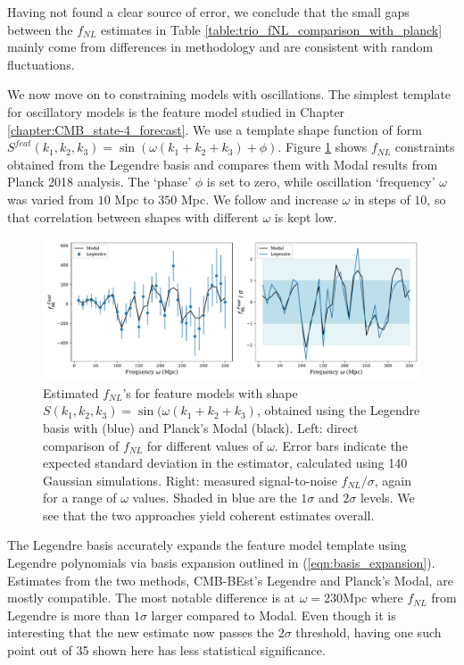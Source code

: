 Having not found a clear source of error, we conclude that the small gaps between the $f_{NL}$ estimates in Table \ref{table:trio_fNL_comparison_with_planck} mainly come from differences in methodology and are consistent with random fluctuations.

We now move on to constraining models with oscillations. The simplest template for oscillatory models is the feature model studied in Chapter \ref{chapter:CMB_state-4_forecast}. We use a template shape function of form $S^{feat}(k_1,k_2,k_3) = \sin(\omega (k_1 + k_2 + k_3) + \phi)$. Figure \ref{fig:sine_template_frequency_Legendre_Modal} shows $f_{NL}$ constraints obtained from the Legendre basis and compares them with Modal results from Planck 2018 analysis. The `phase' $\phi$ is set to zero, while oscillation `frequency' $\omega$ was varied from $10$ Mpc to $350$ Mpc. We follow \cite{Fergusson2015a} and increase $\omega$ in steps of $10$, so that correlation between shapes with different $\omega$ is kept low.

\begin{figure}[htbp!] 
	\centering    
	\includegraphics[width=\textwidth]{sine_template_frequency_Legendre_Modal.pdf}
	\caption{Estimated $f_{NL}$'s for feature models with shape $S(k_1,k_2,k_3) = \sin(\omega (k_1 + k_2 + k_3)$, obtained using the Legendre basis with (blue) and Planck's Modal (black). Left: direct comparison of $f_{NL}$ for different values of $\omega$. Error bars indicate the expected standard deviation in the estimator, calculated using 140 Gaussian simulations. Right: measured signal-to-noise $f_{NL}/\sigma$, again for a range of $\omega$ values. Shaded in blue are the $1\sigma$ and $2\sigma$ levels. We see that the two approaches yield coherent estimates overall.}
	\label{fig:sine_template_frequency_Legendre_Modal}
\end{figure}

The Legendre basis accurately expands the feature model template using Legendre polynomials via basis expansion outlined in (\ref{eqn:basis_expansion}). Estimates from the two methods, CMB-BEst's Legendre and Planck's Modal, are mostly compatible. The most notable difference is at $\omega=230$Mpc where $f_{NL}$ from Legendre is more than $1\sigma$ larger compared to Modal. Even though it is interesting that the new estimate now passes the $2\sigma$ threshold, having one such point out of 35 shown here has less statistical significance.

